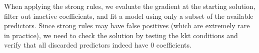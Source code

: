 When applying the strong rules, we evaluate the gradient at the starting solution, filter out inactive
coefficients, and fit a model using only a subset of the available predictors. Since strong rules may have false
positives (which are extremely rare in practice), we need to check the solution by testing the kkt conditions and
verify that all discarded predictors indeed have 0 coefficients.






